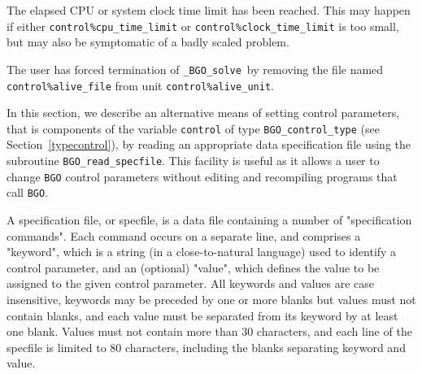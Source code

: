 \documentclass{galahad}
\newcommand{\packagename}{BGO}
\newcommand{\fullpackagename}{\libraryname\_\packagename}
\newcommand{\solver}{{\tt \fullpackagename\_solve}}
\begin{document}
\begin{description}
 The elapsed CPU or system clock time limit has been
    reached. This may happen if either {\tt control\%cpu\_time\_limit} or
    {\tt control\%clock\_time\_limit} is too small, but may also be symptomatic
    of a badly scaled problem.

 The user has forced termination of \solver\
     by removing the file named {\tt control\%a\-live\_file} from
     unit {\tt control\%alive\_unit}.

\end{description}


\galfeatures
\noindent In this section, we describe an alternative means of setting
control parameters, that is components of the variable {\tt control} of type
{\tt \packagename\_control\_type}
(see Section~\ref{typecontrol}),
by reading an appropriate data specification file using the
subroutine {\tt \packagename\_read\_specfile}. This facility
is useful as it allows a user to change  {\tt \packagename} control parameters
without editing and recompiling programs that call {\tt \packagename}.

A specification file, or specfile, is a data file containing a number of
"specification commands". Each command occurs on a separate line,
and comprises a "keyword",
which is a string (in a close-to-natural language) used to identify a
control parameter, and
an (optional) "value", which defines the value to be assigned to the given
control parameter. All keywords and values are case insensitive,
keywords may be preceded by one or more blanks but
values must not contain blanks, and
each value must be separated from its keyword by at least one blank.
Values must not contain more than 30 characters, and
each line of the specfile is limited to 80 characters,
including the blanks separating keyword and value.
\end{document}
